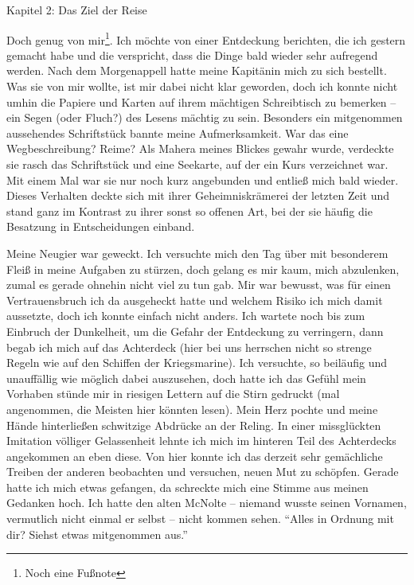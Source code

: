 \vspace{0.5cm}\noindent

{\label{1Kapitel 2: Das Ziel der Reise}\vspace{0.5cm}\noindent\LARGE Kapitel 2: Das Ziel der Reise}
\renewcommand{\storychapter}{Kapitel 2: Das Ziel der Reise}

\vspace{0.5cm}\noindent
Doch genug von mir\footnote{Noch eine Fußnote}. Ich möchte von einer Entdeckung berichten, die ich gestern gemacht habe und die verspricht, dass die Dinge bald wieder sehr aufregend werden. Nach dem Morgenappell hatte meine Kapitänin mich zu sich bestellt. Was sie von mir wollte, ist mir dabei nicht klar geworden, doch ich konnte nicht umhin die Papiere und Karten auf ihrem mächtigen Schreibtisch zu bemerken -- ein Segen (oder Fluch?) des Lesens mächtig zu sein. Besonders ein mitgenommen aussehendes Schriftstück bannte meine Aufmerksamkeit. War das eine Wegbeschreibung? Reime? Als Mahera meines Blickes gewahr wurde, verdeckte sie rasch das Schriftstück und eine Seekarte, auf der ein Kurs verzeichnet war. Mit einem Mal war sie nur noch kurz angebunden und entließ mich bald wieder. Dieses Verhalten deckte sich mit ihrer Geheimniskrämerei der letzten Zeit und stand ganz im Kontrast zu ihrer sonst so offenen Art, bei der sie häufig die Besatzung in Entscheidungen einband.

Meine Neugier war geweckt. Ich versuchte mich den Tag über mit besonderem Fleiß in meine Aufgaben zu stürzen, doch gelang es mir kaum, mich abzulenken, zumal es gerade ohnehin nicht viel zu tun gab. Mir war bewusst, was für einen Vertrauensbruch ich da ausgeheckt hatte und welchem Risiko ich mich damit aussetzte, doch ich konnte einfach nicht anders. Ich wartete noch bis zum Einbruch der Dunkelheit, um die Gefahr der Entdeckung zu verringern, dann begab ich mich auf das Achterdeck (hier bei uns herrschen nicht so strenge Regeln wie auf den Schiffen der Kriegsmarine). Ich versuchte, so beiläufig und unauffällig wie möglich dabei auszusehen, doch hatte ich das Gefühl mein Vorhaben stünde mir in riesigen Lettern auf die Stirn gedruckt (mal angenommen, die Meisten hier könnten lesen). Mein Herz pochte und meine Hände hinterließen schwitzige Abdrücke an der Reling. In einer missglückten Imitation völliger Gelassenheit lehnte ich mich im hinteren Teil des Achterdecks angekommen an eben diese. Von hier konnte ich das derzeit sehr gemächliche Treiben der anderen beobachten und versuchen, neuen Mut zu schöpfen. Gerade hatte ich mich etwas gefangen, da schreckte mich eine Stimme aus meinen Gedanken hoch. Ich hatte den alten McNolte -- niemand wusste seinen Vornamen, vermutlich nicht einmal er selbst -- nicht kommen sehen. \enquote{Alles in Ordnung mit dir? Siehst etwas mitgenommen aus.}

